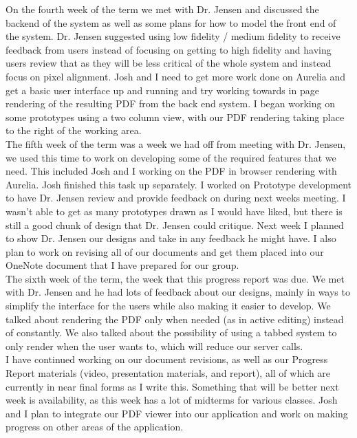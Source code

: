 \documentclass[onecolumn, draftclsnofoot,10pt, compsoc]{IEEEtran}
\begin{document}
\noindent On the fourth week of the term we met with Dr. Jensen and discussed the backend 
of the system as well as some plans for how to model the front end of the system. Dr. Jensen 
suggested using low fidelity / medium fidelity to receive feedback from users instead of 
focusing on getting to high fidelity and having users review that as they will be less 
critical of the whole system and instead focus on pixel alignment. Josh and I need to get more 
work done on Aurelia and get a basic user interface up and running and try working towards 
in page rendering of the resulting PDF from the back end system. I began working on some 
prototypes using a two column view, with our PDF rendering taking place to the right of the
working area. \\


\noindent The fifth week of the term was a week we had off from meeting with Dr. Jensen, 
we used this time to work on developing some of the required features that we need. This
included Josh and I working on the PDF in browser rendering with Aurelia.
Josh finished this task up separately. I worked on Prototype development to have Dr. 
Jensen review and provide feedback on during next weeks meeting. I wasn't able to get as 
many prototypes drawn as I would have liked, but there is still a good chunk of design that
Dr. Jensen could critique. Next week I planned to show Dr. Jensen our designs and take in 
any feedback he might have. I also plan to work on revising all of our documents and get them
placed into our OneNote document that I have prepared for our group. \\

\noindent The sixth week of the term, the week that this progress report was due. We met with 
Dr. Jensen and he had lots of feedback about our designs, mainly in ways to simplify the interface 
for the users while also making it easier to develop. We talked about rendering the PDF only 
when needed (as in active editing) instead of constantly. We also talked about the possibility 
of using a tabbed system to only render when the user wants to, which will reduce our server calls. \\

\noindent I have continued working on our document revisions, as well as our Progress
Report materials (video, presentation materials, and report), all of which are currently in near
final forms as I write this. Something that will be better next week is availability, 
as this week has a lot of midterms for various classes. Josh and I plan to integrate our PDF 
viewer into our application and work on making progress on other areas of the application. \\
\end{document}
